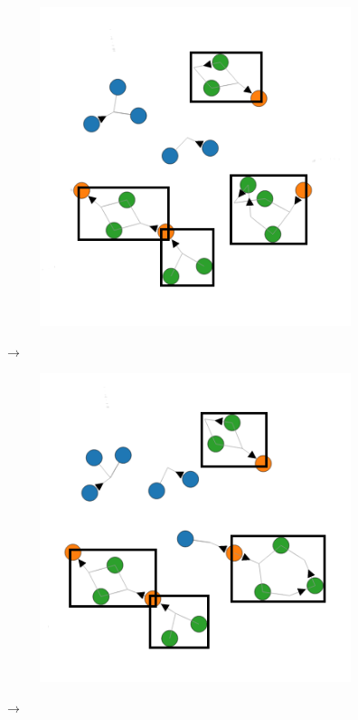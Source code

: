     \begin{figure}[H]
        \centering
        \begin{subfigure}{0.4\linewidth}
            \includegraphics[width=\textwidth]{diagrams/all-diagrams-r2.png}
        \end{subfigure}
        $\longrightarrow$
        \begin{subfigure}{0.4\linewidth}
            \includegraphics[width=\textwidth]{diagrams/all-diagrams-r3.png}
        \end{subfigure}
        $\longrightarrow$
    \end{figure}

